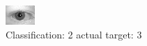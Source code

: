 \begin{figure}[h!]
\begin{center}
\includegraphics[width=0.60\columnwidth]{figures/ID680_class_2_target_3.png}
\end{center}
\caption{ Classification: 2 actual target: 3}
\label{fig:ID680_class_2_target_3}
\end{figure}
